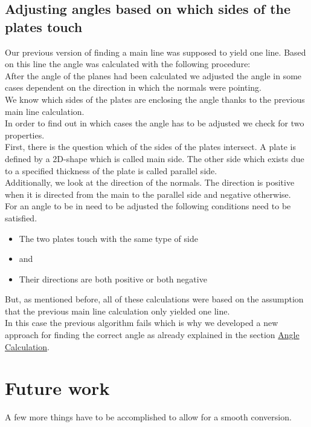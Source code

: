 \documentclass[../ClassicThesis.tex]{subfiles}
\begin{document}
\subsection{Adjusting angles based on which sides of the plates touch}
Our previous version of finding a main line was supposed to yield one line. Based on this line the angle was calculated with the following procedure:\\ 
After the angle of the planes had been calculated we adjusted the angle in some cases dependent on the direction in which the normals were pointing. \\
We know which sides of the plates are enclosing the angle thanks to the previous main line calculation.\\
In order to find out in which cases the angle has to be adjusted we check for two properties.\\
First, there is the question which of the sides of the plates intersect. A plate is defined by a 2D-shape which is called main side. The other side which exists due to a specified thickness of the plate is called parallel side.\\
Additionally, we look at the direction of the normals. The direction is positive when it is directed from the main to the parallel side and negative otherwise.\\
For an angle to be in need to be adjusted the following conditions need to be satisfied.
\begin{itemize}
    \item The two plates touch with the same type of side 
    \item[] and
    \item Their directions are both positive or both negative
\end{itemize}
But, as mentioned before, all of these calculations were based on the assumption that the previous main line calculation only yielded one line.\\
In this case the previous algorithm fails which is why we developed a new approach for finding the correct angle as already explained in the section \hyperref[angleCalculation]{Angle Calculation}.

\section{Future work}
A few more things have to be accomplished to allow for a smooth conversion. 
\end{document}
